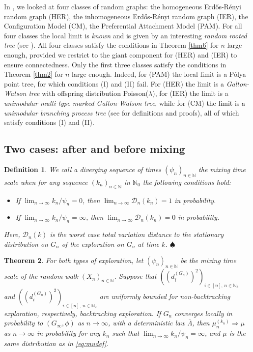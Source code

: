 \documentclass[11pt]{article}
\numberwithin{equation}{section}
\theoremstyle{plain}
\newtheorem{theorem}{Theorem}[section]
\newtheorem{definition}[theorem]{Definition}
\newcommand{\N}{\mathbb N}
\newcommand{\weak}{\Longrightarrow}
\newcommand{\dn}{d^{(G_{n})}}
\begin{document}
In \cite{HHP}, we looked at four classes of random graphs: the homogeneous Erd\H{o}s-R\'enyi random graph (HER), the inhomogeneous Erd\H{o}s-R\'enyi random graph (IER), the Configuration Model (CM), the Preferential Attachment Model (PAM). For all four classes the local limit is \emph{known} and is given by an interesting \emph{random rooted tree} (see \cite{RvdH1,RvdH2}). All four classes satisfy the conditions in Theorem \ref{thm6} for $n$ large enough, provided we restrict to the giant component for (HER) and (IER) to ensure connectedness. Only the first three classes satisfy the conditions in Theorem \ref{thm2} for $n$ large enough. Indeed, for (PAM) the local limit is a P\'olya point tree, for which conditions (I) and (II) fail. For (HER) the limit is a \emph{Galton-Watson tree} with offspring distribution {\rm Poisson}($\lambda$), for (IER) the limit is a \emph{unimodular multi-type marked Galton-Watson tree}, while for (CM) the limit is a \emph{unimodular branching process tree} (see \cite{RvdH2} for definitions and proofs), all of which satisfy conditions (I) and (II). 


\subsection{Two cases: after and before mixing}

\begin{definition}
{\rm We call a diverging sequence of times $(\psi_{n})_{n\in\N}$ the \textit{mixing time scale} when for any sequence $(k_{n})_{n\in\N}$ in $\N_{0}$ the following conditions hold:}
\begin{itemize}
\item[{\rm (1)}] {\rm If $\lim_{n\to\infty} k_{n}/\psi_{n}=0$, then $\lim_{n\to\infty} \mathcal{D}_{n}(k_{n}) = 1$ in probability.}
\item[{\rm (2)}] {\rm If $\lim_{n\to\infty} k_{n}/\psi_{n}=\infty$, then $\lim_{n\to\infty} \mathcal{D}_{n}(k_{n}) = 0$ in probability.}
\end{itemize}
{\rm Here, $\mathcal{D}_{n}(k)$ is the worst case total variation distance to the stationary distribution on $G_n$ of the exploration on $G_n$ at time $k$.}
\hfill$\spadesuit$
\end{definition}

\begin{theorem}
\label{thmA1}
For both types of exploration, let $(\psi_{n})_{n\in\N}$ be the mixing time scale of the random walk $(X_{n})_{n\in\N}$. Suppose that $((\dn_{i})^{2})_{i\in [n],\,n\in\N_{3}}$ and $((\dn_{i})^{2})_{i\in [n],\,n\in\N_{2}}$ are uniformly bounded for non-backtracking exploration, respectively, backtracking exploration. If $G_n$ converges locally in probability to $(G_{\infty},\phi)$ as $n\to\infty$, with a deterministic law $\bar{\Lambda}$, then $\mu_{n}^{(k_n)} \weak \mu$ as $n\to\infty$ in probability for any $k_n$ such that $\lim_{n\to\infty} k_{n}/\psi_{n}=\infty$, and $\mu$ is the same distribution as in \eqref{eq:mudef}.
\end{theorem}
\end{document}
